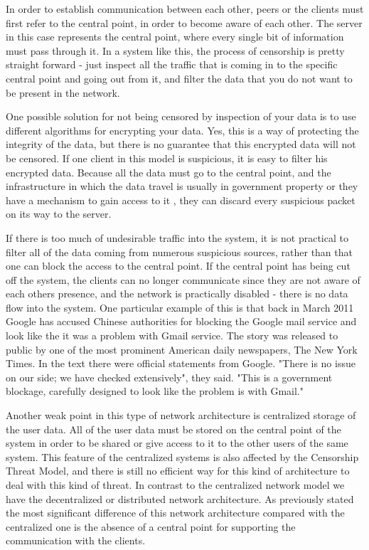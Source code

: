 In order to establish communication between each other, peers or the clients must first refer to the central point, in order to become aware of each other. The server in this case represents the central point, where every single bit of information must pass through it. In a system like this, the process of censorship is pretty straight forward - just inspect all the traffic that is coming in to the specific central point and going out from it, and filter the data that you do not want to be present in the network. 

One possible solution for not being censored by inspection of your data is to use different algorithms for encrypting your data. Yes, this is a way of protecting the integrity of the data, but there is no guarantee that this encrypted data will not be censored. If one client in this model is suspicious, it is easy to filter his encrypted data. Because all the data must go to the central point, and the infrastructure in which the data travel is usually in government property or they have a mechanism to gain access to it \cite{dianotti2011}, they can discard every suspicious packet on its way to the server.

If there is too much of undesirable traffic into the system, it is not practical to filter all of the data coming from numerous suspicious sources, rather than that one can block the access to the central point. If the central point has being cut off the system, the clients can no longer communicate since they are not aware of each others presence, and the network is practically disabled - there is no data flow into the system. One particular example of this is that back in March 2011 Google has accused Chinese authorities for blocking the Google mail service and look like the it was a problem with Gmail service. The story was released to public by one of the most prominent American daily newspapers, The New York Times. In the text there were official statements from Google. "There is no issue on our side; we have checked extensively", they said. "This is a government blockage, carefully designed to look like the problem is with Gmail." \cite{web:newyorktimes}

Another weak point in this type of network architecture is centralized storage of the user data. All of the user data must be stored on the central point of the system in order to be shared or give access to it to the other users of the same system. This feature of the centralized systems is also affected by the Censorship Threat Model, and there is still no efficient way for this kind of architecture to deal with this kind of threat.
In contrast to the centralized network model we have the decentralized or distributed network architecture. As previously stated the most significant difference of this network architecture compared with the centralized one is the absence of a central point for supporting the communication with the clients. 

